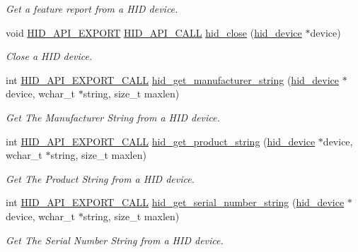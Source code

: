 \begin{DoxyCompactItemize}
\begin{DoxyCompactList}\small\item\em \-Get a feature report from a \-H\-I\-D device. \end{DoxyCompactList}\item 
void \hyperlink{hidapi_8h_aa60150016800ccb88fdf140e8553ae13}{\-H\-I\-D\-\_\-\-A\-P\-I\-\_\-\-E\-X\-P\-O\-R\-T} \hyperlink{hidapi_8h_af140a25716604e86096670a505a58ee0}{\-H\-I\-D\-\_\-\-A\-P\-I\-\_\-\-C\-A\-L\-L} \hyperlink{group___a_p_i_ga9b64828273b8dd052731e79ba9e1a516}{hid\-\_\-close} (\hyperlink{hidapi_8h_aa6da74d5686d198dd3e5440e60088fcc}{hid\-\_\-device} $\ast$device)
\begin{DoxyCompactList}\small\item\em \-Close a \-H\-I\-D device. \end{DoxyCompactList}\item 
int \hyperlink{hidapi_8h_a70c49eda5025c1bc455af77da19ca312}{\-H\-I\-D\-\_\-\-A\-P\-I\-\_\-\-E\-X\-P\-O\-R\-T\-\_\-\-C\-A\-L\-L} \hyperlink{group___a_p_i_ga2652b2ff0f3982a8c5791718e2a2e6cb}{hid\-\_\-get\-\_\-manufacturer\-\_\-string} (\hyperlink{hidapi_8h_aa6da74d5686d198dd3e5440e60088fcc}{hid\-\_\-device} $\ast$device, wchar\-\_\-t $\ast$string, size\-\_\-t maxlen)
\begin{DoxyCompactList}\small\item\em \-Get \-The \-Manufacturer \-String from a \-H\-I\-D device. \end{DoxyCompactList}\item 
int \hyperlink{hidapi_8h_a70c49eda5025c1bc455af77da19ca312}{\-H\-I\-D\-\_\-\-A\-P\-I\-\_\-\-E\-X\-P\-O\-R\-T\-\_\-\-C\-A\-L\-L} \hyperlink{group___a_p_i_gaa78526041c4bb470b2c1ad9eb0791c5f}{hid\-\_\-get\-\_\-product\-\_\-string} (\hyperlink{hidapi_8h_aa6da74d5686d198dd3e5440e60088fcc}{hid\-\_\-device} $\ast$device, wchar\-\_\-t $\ast$string, size\-\_\-t maxlen)
\begin{DoxyCompactList}\small\item\em \-Get \-The \-Product \-String from a \-H\-I\-D device. \end{DoxyCompactList}\item 
int \hyperlink{hidapi_8h_a70c49eda5025c1bc455af77da19ca312}{\-H\-I\-D\-\_\-\-A\-P\-I\-\_\-\-E\-X\-P\-O\-R\-T\-\_\-\-C\-A\-L\-L} \hyperlink{group___a_p_i_ga73994b7820264d3604d6ee25de9c66be}{hid\-\_\-get\-\_\-serial\-\_\-number\-\_\-string} (\hyperlink{hidapi_8h_aa6da74d5686d198dd3e5440e60088fcc}{hid\-\_\-device} $\ast$device, wchar\-\_\-t $\ast$string, size\-\_\-t maxlen)
\begin{DoxyCompactList}\small\item\em \-Get \-The \-Serial \-Number \-String from a \-H\-I\-D device. \end{DoxyCompactList}\item 

\end{DoxyCompactItemize}
